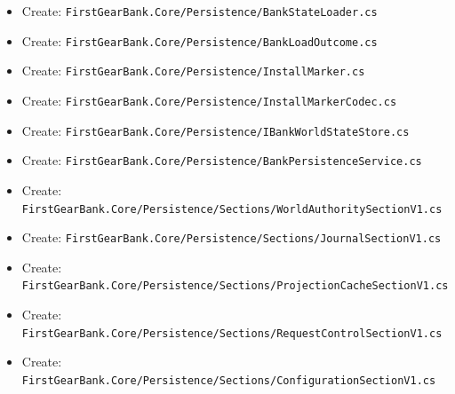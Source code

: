 \documentclass[
  10pt,
  letterpaper,
]{article}
\begin{document}
\begin{itemize}
  Create:
  \texttt{FirstGearBank.}\allowbreak{}\texttt{Core/}\allowbreak{}\texttt{Persistence/}\allowbreak{}\texttt{BankStateSerializer.}\allowbreak{}\texttt{cs}
\item
  Create:
  \texttt{FirstGearBank.}\allowbreak{}\texttt{Core/}\allowbreak{}\texttt{Persistence/}\allowbreak{}\texttt{BankStateLoader.}\allowbreak{}\texttt{cs}
\item
  Create:
  \texttt{FirstGearBank.}\allowbreak{}\texttt{Core/}\allowbreak{}\texttt{Persistence/}\allowbreak{}\texttt{BankLoadOutcome.}\allowbreak{}\texttt{cs}
\item
  Create:
  \texttt{FirstGearBank.}\allowbreak{}\texttt{Core/}\allowbreak{}\texttt{Persistence/}\allowbreak{}\texttt{InstallMarker.}\allowbreak{}\texttt{cs}
\item
  Create:
  \texttt{FirstGearBank.}\allowbreak{}\texttt{Core/}\allowbreak{}\texttt{Persistence/}\allowbreak{}\texttt{InstallMarkerCodec.}\allowbreak{}\texttt{cs}
\item
  Create:
  \texttt{FirstGearBank.}\allowbreak{}\texttt{Core/}\allowbreak{}\texttt{Persistence/}\allowbreak{}\texttt{IBankWorldStateStore.}\allowbreak{}\texttt{cs}
\item
  Create:
  \texttt{FirstGearBank.}\allowbreak{}\texttt{Core/}\allowbreak{}\texttt{Persistence/}\allowbreak{}\texttt{BankPersistenceService.}\allowbreak{}\texttt{cs}
\item
  Create:
  \texttt{FirstGearBank.}\allowbreak{}\texttt{Core/}\allowbreak{}\texttt{Persistence/}\allowbreak{}\texttt{Sections/}\allowbreak{}\texttt{WorldAuthoritySectionV1.}\allowbreak{}\texttt{cs}
\item
  Create:
  \texttt{FirstGearBank.}\allowbreak{}\texttt{Core/}\allowbreak{}\texttt{Persistence/}\allowbreak{}\texttt{Sections/}\allowbreak{}\texttt{JournalSectionV1.}\allowbreak{}\texttt{cs}
\item
  Create:
  \texttt{FirstGearBank.}\allowbreak{}\texttt{Core/}\allowbreak{}\texttt{Persistence/}\allowbreak{}\texttt{Sections/}\allowbreak{}\texttt{ProjectionCacheSectionV1.}\allowbreak{}\texttt{cs}
\item
  Create:
  \texttt{FirstGearBank.}\allowbreak{}\texttt{Core/}\allowbreak{}\texttt{Persistence/}\allowbreak{}\texttt{Sections/}\allowbreak{}\texttt{RequestControlSectionV1.}\allowbreak{}\texttt{cs}
\item
  Create:
  \texttt{FirstGearBank.}\allowbreak{}\texttt{Core/}\allowbreak{}\texttt{Persistence/}\allowbreak{}\texttt{Sections/}\allowbreak{}\texttt{ConfigurationSectionV1.}\allowbreak{}\texttt{cs}

\end{itemize}
\end{document}
